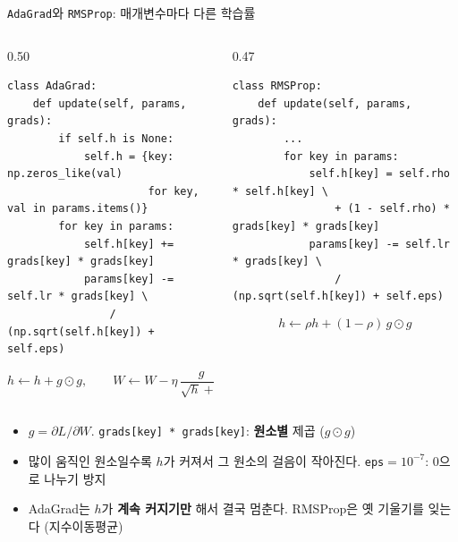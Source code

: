 \documentclass[aspectratio=169,11pt]{beamer}
\newcommand{\codesmall}{\ttfamily\fontsize{7.4}{8.3}\selectfont}
\newcommand{\code}[1]{\texttt{#1}}
\begin{document}
\begin{frame}[fragile]{\code{AdaGrad}와 \code{RMSProp}: 매개변수마다 다른 학습률}
\begin{columns}[T,onlytextwidth]
\begin{column}{0.50\textwidth}
\begin{lstlisting}[basicstyle=\codesmall]
class AdaGrad:
    def update(self, params, grads):
        if self.h is None:
            self.h = {key: np.zeros_like(val)
                      for key, val in params.items()}
        for key in params:
            self.h[key] += grads[key] * grads[key]
            params[key] -= self.lr * grads[key] \
                / (np.sqrt(self.h[key]) + self.eps)
\end{lstlisting}
\small
\[
h \leftarrow h + g\odot g,\qquad
W \leftarrow W - \eta\,\frac{g}{\sqrt h+\varepsilon}
\]
\end{column}
\begin{column}{0.47\textwidth}
\begin{lstlisting}[basicstyle=\codesmall]
class RMSProp:
    def update(self, params, grads):
        ...
        for key in params:
            self.h[key] = self.rho * self.h[key] \
                + (1 - self.rho) * grads[key] * grads[key]
            params[key] -= self.lr * grads[key] \
                / (np.sqrt(self.h[key]) + self.eps)
\end{lstlisting}
\small
\[
h \leftarrow \rho h + (1-\rho)\, g\odot g
\]
\end{column}
\end{columns}
\vskip1mm
\small
\begin{itemize}
\item $g=\partial L/\partial W$. \code{grads[key] * grads[key]}: \textbf{원소별} 제곱 ($g\odot g$)
\item 많이 움직인 원소일수록 $h$가 커져서 그 원소의 걸음이 작아진다. \code{eps}$=10^{-7}$: $0$으로 나누기 방지
\item AdaGrad는 $h$가 \textbf{계속 커지기만} 해서 결국 멈춘다. RMSProp은 옛 기울기를 잊는다 (지수이동평균)
\end{itemize}
\end{frame}
\end{document}
